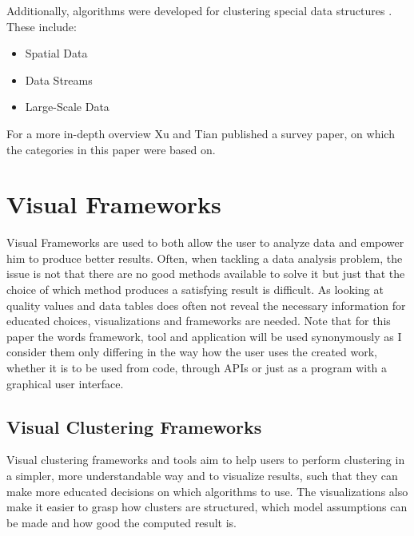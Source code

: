 \documentclass[
	a4paper,
	english,
	twoside,
	openright,               
	11pt                            
	]{report}
\begin{document}
Additionally, algorithms were developed for clustering special data structures \cite{surveyclustering}. These include:

\begin{itemize}
  \item Spatial Data
  \item Data Streams
  \item Large-Scale Data
\end{itemize}

For a more in-depth overview Xu and Tian \cite{surveyclustering} published a survey paper, on which the categories in this paper were based on.

\section{Visual Frameworks}
Visual Frameworks are used to both allow the user to analyze data and empower him to produce better results. Often, when tackling a data analysis problem, the issue is not that there are no good methods available to solve it but just that the choice of which method produces a satisfying result is difficult. As looking at quality values and data tables does often not reveal the necessary information for educated choices, visualizations and frameworks are needed. Note that for this paper the words framework, tool and application will be used synonymously as I consider them only differing in the way how the user uses the created work, whether it is to be used from code, through APIs or just as a program with a graphical user interface.

\subsection{Visual Clustering Frameworks}
Visual clustering frameworks and tools aim to help users to perform clustering in a simpler, more understandable way and to visualize results, such that they can make more educated decisions on which algorithms to use. The visualizations also make it easier to grasp how clusters are structured, which model assumptions can be made and how good the computed result is.
\end{document}
